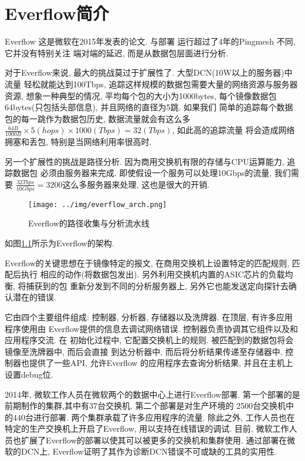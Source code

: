 
\chapter{Everflow简介}

  Everflow \cite{greenberg2016packet} 这是微软在2015年发表的论文. 与部署
运行超过了4年的Pingmesh \cite{guo2015pingmesh}不同, 它并没有特别关注
端对端的延迟, 而是从数据包层面进行分析.

  对于Everflow来说, 最大的挑战莫过于扩展性了. 大型DCN(10W以上的服务器)中流量
轻松就能达到100Tbps, 追踪这样规模的数据包需要大量的网络资源与服务器资源,
想象一种典型的情况, 平均每个包的大小为1000bytes,
每个镜像数据包64bytes(只包括头部信息), 并且网络的直径为5跳. 如果我们
简单的追踪每个数据包的每一跳作为数据包历史, 数据流量就会有这么多
$\frac{64B}{1000B} \times 5(hops) \times 1000(Tbps) = 32(Tbps)$, 如此高的追踪流量
将会造成网络拥塞和丢包, 特别是当网络利用率很高时.

  另一个扩展性的挑战是路径分析. 因为商用交换机有限的存储与CPU运算能力, 追踪数据包
必须由服务器来完成. 即使假设一个服务可以处理10Gbps的流量, 我们需要
$\frac{32Tbps}{10Gbps} = 3200$这么多服务器来处理, 这也是很大的开销.


\begin{figure}
  \centering
  \texttt{[image: ../img/everflow\_arch.png]}
  \caption{Everflow的路径收集与分析流水线}
  \label{fig:everflow_arch}
\end{figure}

  如图\ref{fig:everflow_arch}所示为Everflow的架构.

  Everflow的关键思想在于镜像特定的报文, 在商用交换机上设置特定的匹配规则, 匹配后执行
相应的动作(将数据包发出). 另外利用交换机内置的ASIC芯片的负载均衡, 将捕获到的包
重新分发到不同的分析服务器上, 另外它也能发送定向探针去确认潜在的错误.

  它由四个主要组件组成: 控制器, 分析器, 存储器以及洗牌器. 在顶层, 有许多应用程序使用由
Everflow提供的信息去调试网络错误. 控制器负责协调其它组件以及和应用程序交流. 在
初始化过程中, 它配置交换机上的规则. 被匹配到的数据包将会镜像至洗牌器中, 而后会直接
到达分析器中, 而后将分析结果传递至存储器中. 控制器也提供了一些API, 允许Everflow
的应用程序去查询分析结果, 并且在主机上设置debug位.

  2014年, 微软工作人员在微软两个的数据中心上进行Everflow部署.
第一个部署的是前期制作的集群,其中有37台交换机. 第二个部署是对生产环境的
2500台交换机中的440台进行部署. 两个集群承载了许多应用程序的流量.
除此之外, 工作人员也在特定的生产交换机上开启了Everflow, 用以支持在线错误的调试.
目前, 微软工作人员也扩展了Everflow的部署以使其可以被更多的交换机和集群使用.
通过部署在微软的DCN上, Everflow证明了其作为诊断DCN错误不可或缺的工具的实用性.

